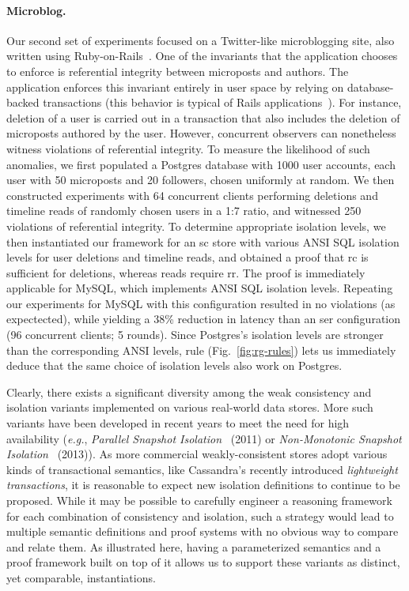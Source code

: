 \paragraph{Microblog.} Our second set of experiments focused on a Twitter-like microblogging
site, also written using Ruby-on-Rails~\cite{railsbook}. One of the
invariants that the application chooses to enforce is referential
integrity between microposts and authors. The application enforces
this invariant entirely in user space by relying on database-backed
transactions (this behavior is typical of Rails
applications~\cite{bailisferal}).  For instance, deletion of a user is
carried out in a transaction that also includes the deletion of
microposts authored by the user.  However, concurrent observers can
nonetheless witness violations of referential integrity. To measure
the likelihood of such anomalies, we first populated a Postgres
database with 1000 user accounts, each user with 50 microposts and 20
followers, chosen uniformly at random. We then constructed experiments
with 64 concurrent clients performing deletions and timeline reads of
randomly chosen users in a 1:7 ratio, and witnessed 250 violations of
referential integrity. To determine appropriate isolation levels, we
then instantiated our framework for an {\sc sc} store with various
ANSI SQL isolation levels for user deletions and timeline reads, and
obtained a proof that {\sc rc} is sufficient for deletions, whereas
reads require {\sc rr}. The proof is immediately applicable for MySQL,
which implements ANSI SQL isolation levels. Repeating our experiments
for MySQL with this configuration resulted in no violations (as
expectected), while yielding a 38\% reduction in latency than an {\sc
  ser} configuration (96 concurrent clients; 5 rounds).  Since
Postgres's isolation levels are stronger than the corresponding ANSI
levels,  rule (Fig.~\ref{fig:rg-rules}) lets us
immediately deduce that the same choice of isolation levels also work
on Postgres.

Clearly, there exists a significant diversity among the weak
consistency and isolation variants implemented on various real-world
data stores. More such variants have been developed in recent years to
meet the need for high availability (\emph{e.g.}, \emph{Parallel
  Snapshot Isolation}~\cite{psi} (2011) or \emph{Non-Monotonic
  Snapshot Isolation}~\cite{nmsi} (2013)).  As more commercial
weakly-consistent stores adopt various kinds of transactional
semantics, like Cassandra's recently introduced \emph{lightweight
  transactions}, it is reasonable to expect new isolation
definitions to continue to be proposed.  While it may be possible to
carefully engineer a reasoning framework for each combination of
consistency and isolation, such a strategy would lead to multiple
semantic definitions and proof systems with no obvious way to compare
and relate them. As illustrated here, having a parameterized semantics
and a proof framework built on top of it allows us to support these
variants as distinct, yet comparable, instantiations.





